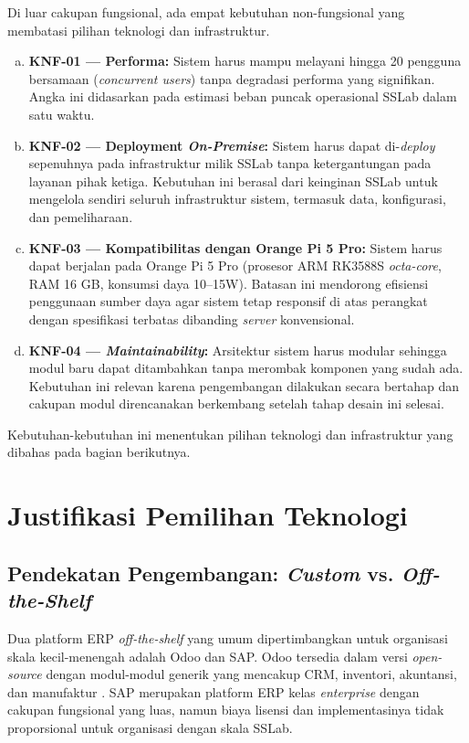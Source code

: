 Di luar cakupan fungsional, ada empat kebutuhan non-fungsional yang membatasi pilihan teknologi dan infrastruktur.

\begin{enumerate}[a)]
    \item \textbf{KNF-01 — Performa:} Sistem harus mampu melayani hingga 20 pengguna bersamaan (\textit{concurrent users}) tanpa degradasi performa yang signifikan. Angka ini didasarkan pada estimasi beban puncak operasional SSLab dalam satu waktu.

    \item \textbf{KNF-02 — Deployment \textit{On-Premise}:} Sistem harus dapat di-\textit{deploy} sepenuhnya pada infrastruktur milik SSLab tanpa ketergantungan pada layanan pihak ketiga. Kebutuhan ini berasal dari keinginan SSLab untuk mengelola sendiri seluruh infrastruktur sistem, termasuk data, konfigurasi, dan pemeliharaan.

    \item \textbf{KNF-03 — Kompatibilitas dengan Orange Pi 5 Pro:} Sistem harus dapat berjalan pada Orange Pi 5 Pro (prosesor ARM RK3588S \textit{octa-core}, RAM 16 GB, konsumsi daya 10--15W). Batasan ini mendorong efisiensi penggunaan sumber daya agar sistem tetap responsif di atas perangkat dengan spesifikasi terbatas dibanding \textit{server} konvensional.

    \item \textbf{KNF-04 — \textit{Maintainability}:} Arsitektur sistem harus modular sehingga modul baru dapat ditambahkan tanpa merombak komponen yang sudah ada. Kebutuhan ini relevan karena pengembangan dilakukan secara bertahap dan cakupan modul direncanakan berkembang setelah tahap desain ini selesai.
\end{enumerate}

Kebutuhan-kebutuhan ini menentukan pilihan teknologi dan infrastruktur yang dibahas pada bagian berikutnya.


\section{Justifikasi Pemilihan Teknologi}

\subsection{Pendekatan Pengembangan: \textit{Custom} vs. \textit{Off-the-Shelf}}

Dua platform ERP \textit{off-the-shelf} yang umum dipertimbangkan untuk organisasi skala kecil-menengah adalah Odoo dan SAP. Odoo tersedia dalam versi \textit{open-source} dengan modul-modul generik yang mencakup CRM, inventori, akuntansi, dan manufaktur \cite{odoo2025documentation}. SAP merupakan platform ERP kelas \textit{enterprise} dengan cakupan fungsional yang luas, namun biaya lisensi dan implementasinya tidak proporsional untuk organisasi dengan skala SSLab.

